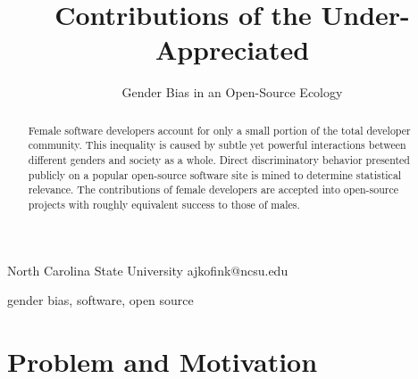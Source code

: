 \documentclass{sigplanconf}
\begin{document}
\setlength{\pdfpageheight}{\paperheight}
\setlength{\pdfpagewidth}{\paperwidth}






\title{Contributions of the Under-Appreciated}
\subtitle{Gender Bias in an Open-Source Ecology}

           {North Carolina State University}
           {ajkofink@ncsu.edu}

\maketitle

\begin{abstract}
  Female software developers account for only a small portion of the total
  developer community. This inequality is caused by subtle yet powerful
  interactions between different genders and society as a whole. Direct
  discriminatory behavior presented publicly on a popular open-source software site is
  mined to determine statistical relevance. The contributions of female developers
  are accepted into open-source projects with roughly equivalent success to
  those of males.
\end{abstract}



\keywords
gender bias, software, open source

\section{Problem and Motivation}
\end{document}
